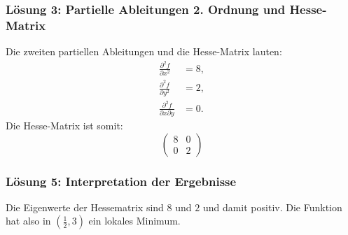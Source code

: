 \documentclass{beamer}
\begin{document}
\begin{frame}
    \frametitle{Lösung 3: Partielle Ableitungen 2. Ordnung und Hesse-Matrix}
    Die zweiten partiellen Ableitungen und die Hesse-Matrix lauten:
    \begin{align*}
        \frac{\partial^2 f}{\partial x^2} &= 8, \\
        \frac{\partial^2 f}{\partial y^2} &= 2, \\
        \frac{\partial^2 f}{\partial x \partial y} &= 0.
    \end{align*}
    Die Hesse-Matrix ist somit:
    \[
    \begin{pmatrix}
        8 & 0 \\
        0 & 2
    \end{pmatrix}
    \]


    \frametitle{Lösung 5: Interpretation der Ergebnisse}
  Die Eigenwerte der Hessematrix sind $8$ und $2$ und damit positiv. Die Funktion hat also in $(\frac{1}{2}, 3)$ ein lokales Minimum. 
\end{frame}
\end{document}
